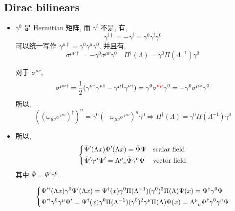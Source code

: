 \subsection{Dirac bilinears}
\begin{itemize}
	\item $\gamma^0$ 是 Hermitian 矩阵, 而 $\gamma^i$ 不是, 有,
	\begin{equation}
		\gamma^{i \dag} = - \gamma^i = \gamma^0 \gamma^i \gamma^0
	\end{equation}
	可以统一写作 $\gamma^{\mu \dag} = \gamma^0 \gamma^\mu \gamma^0$, 并且有,
	\begin{equation}
		\sigma^{\mu \nu \dag} = - \gamma^0 \sigma^{\mu \nu} \gamma^0 \quad \Pi^\dag(\Lambda) = \gamma^0 \Pi(\Lambda^{- 1}) \gamma^0
	\end{equation}
	
	\begin{tcolorbox}[title=calculation:]
		对于 $\sigma^{\mu \nu}$,
		\begin{equation}
			\sigma^{\mu \nu \dag} = \frac{1}{2} (\gamma^{\nu \dag} \gamma^{\mu \dag} - \gamma^{\mu \dag} \gamma^{\nu \dag}) = \gamma^0 \sigma^{\mathcolor{red}{\nu \mu}} \gamma^0 = - \gamma^0 \sigma^{\mu \nu} \gamma^0
		\end{equation}
		所以,
		\begin{equation}
			((\omega_{\mu \nu} \sigma^{\mu \nu})^\dag)^n = \gamma^0 (- \omega_{\mu \nu} \sigma^{\mu \nu})^n \gamma^0 \Longrightarrow \Pi^\dag(\Lambda) = \gamma^0 \Pi(\Lambda^{- 1}) \gamma^0
		\end{equation}
	\end{tcolorbox}
	
	\item 所以,
	\begin{equation} \label{6.2.21}
		\begin{dcases}
			\bar{\Psi}'(\Lambda x) \Psi'(\Lambda x) = \bar{\Psi} \Psi & \text{scalar field} \\
			\bar{\Psi}' \gamma^\mu \Psi' = \tensor{\Lambda}{^\mu_\nu} \bar{\Psi} \gamma^\nu \Psi & \text{vector field}
		\end{dcases}
	\end{equation}
	其中 $\bar{\Psi} = \Psi^\dag \gamma^0$.
	
	\begin{tcolorbox}[title=calculation:]
		\begin{equation}
			\begin{dcases}
				\Psi'^\dag(\Lambda x) \gamma^0 \Psi'(\Lambda x) = \Psi^\dag(x) \gamma^0 \Pi(\Lambda^{- 1}) (\gamma^0)^2 \Pi(\Lambda) \Psi(x) = \Psi^\dag \gamma^0 \Psi \\
				\Psi'^\dag \gamma^0 \gamma^\mu \Psi' = \Psi^\dag(x) \gamma^0 \Pi(\Lambda^{- 1}) (\gamma^0)^2 \gamma^\mu \Pi(\Lambda) \Psi(x) = \tensor{\Lambda}{^\mu_\nu} \Psi^\dag \gamma^0 \gamma^\nu \Psi
			\end{dcases}
		\end{equation}
		

\end{tcolorbox}
\end{itemize}
